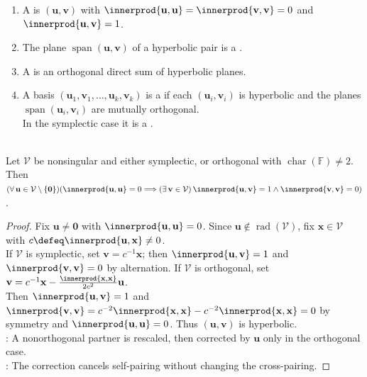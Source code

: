 \begin{definition} \label{def:hyperbolic-pairs-and-spaces} 
\begin{enumerate}[label=(\roman*)]
\setlength{\itemsep}{0pt}
\item A  is $(\mathbf{u},\mathbf{v})$ with $\innerprod{\mathbf{u},\mathbf{u}}=\innerprod{\mathbf{v},\mathbf{v}}=0$ and $\innerprod{\mathbf{u},\mathbf{v}}=1$.
\item The plane $\operatorname{span}(\mathbf{u},\mathbf{v})$ of a hyperbolic pair is a .
\item A  is an orthogonal direct sum of hyperbolic planes.
\item A basis $(\mathbf{u}_1,\mathbf{v}_1,\ldots,\mathbf{u}_k,\mathbf{v}_k)$ is a  if each $(\mathbf{u}_i,\mathbf{v}_i)$ is hyperbolic and the planes $\operatorname{span}(\mathbf{u}_i,\mathbf{v}_i)$ are mutually orthogonal.\\
In the symplectic case it is a .
\end{enumerate}
\end{definition}

\begin{theorem} \label{thm:isotropic-vector-sits-in-hyperbolic-plane} \\
Let $\mathcal{V}$ be nonsingular and either symplectic, or orthogonal with $\operatorname{char}(\mathbb{F})\neq2$.\\
Then $(\forall\,\mathbf{u}\in\mathcal{V}\setminus\{\mathbf{0}\})(\innerprod{\mathbf{u},\mathbf{u}}=0\Longrightarrow(\exists\,\mathbf{v}\in\mathcal{V})\,\innerprod{\mathbf{u},\mathbf{v}}=1\wedge\innerprod{\mathbf{v},\mathbf{v}}=0)$.
\begin{proof}
Fix $\mathbf{u}\neq\mathbf{0}$ with $\innerprod{\mathbf{u},\mathbf{u}}=0$. Since $\mathbf{u}\notin\operatorname{rad}(\mathcal{V})$, fix $\mathbf{x}\in\mathcal{V}$ with $c\defeq\innerprod{\mathbf{u},\mathbf{x}}\neq0$.\\
If $\mathcal{V}$ is symplectic, set $\mathbf{v}=c^{-1}\mathbf{x}$; then $\innerprod{\mathbf{u},\mathbf{v}}=1$ and $\innerprod{\mathbf{v},\mathbf{v}}=0$ by alternation. If $\mathcal{V}$ is orthogonal, set $\mathbf{v}=c^{-1}\mathbf{x}-\frac{\innerprod{\mathbf{x},\mathbf{x}}}{2c^2}\mathbf{u}$.\\
Then $\innerprod{\mathbf{u},\mathbf{v}}=1$ and $\innerprod{\mathbf{v},\mathbf{v}}=c^{-2}\innerprod{\mathbf{x},\mathbf{x}}-c^{-2}\innerprod{\mathbf{x},\mathbf{x}}=0$ by symmetry and $\innerprod{\mathbf{u},\mathbf{u}}=0$. Thus $(\mathbf{u},\mathbf{v})$ is hyperbolic.\\
: A nonorthogonal partner is rescaled, then corrected by $\mathbf{u}$ only in the orthogonal case.\\
: The correction cancels self-pairing without changing the cross-pairing.
\end{proof}
\end{theorem}

